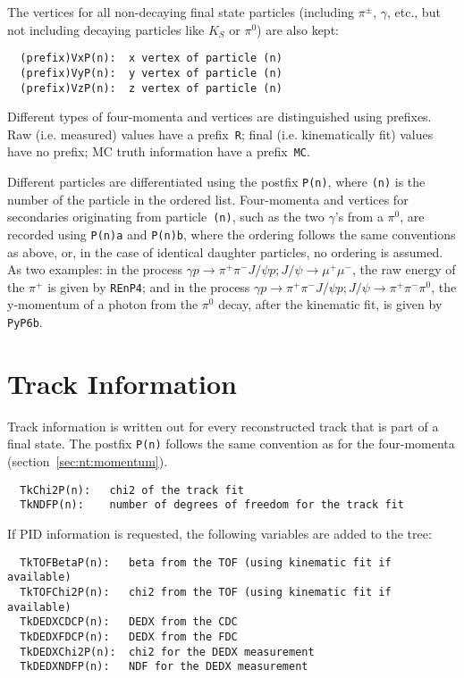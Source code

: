 \documentclass[11pt]{article}
\begin{document}
The vertices for all non-decaying final state particles (including $\pi^\pm$, $\gamma$, etc., but not including decaying particles like $K_S$ or $\pi^0$) are also kept:

\begin{verbatim}
  (prefix)VxP(n):  x vertex of particle (n)
  (prefix)VyP(n):  y vertex of particle (n)
  (prefix)VzP(n):  z vertex of particle (n)
\end{verbatim}

Different types of four-momenta and vertices are distinguished using prefixes.  Raw (i.e. measured) values have a prefix~{\tt R}; final (i.e. kinematically fit) values have no prefix; MC truth information have a prefix~{\tt MC}.

Different particles are differentiated using the postfix {\tt P(n)}, where {\tt (n)} is the number of the particle in the ordered list.  Four-momenta and vertices for secondaries originating from particle~{\tt (n)}, such as the two $\gamma$'s from a $\pi^0$, are recorded using {\tt P(n)a} and {\tt P(n)b}, where the ordering follows the same conventions as above, or, in the case of identical daughter particles, no ordering is assumed.  As two examples: in the process $\gamma p \to\pi^+\pi^-J/\psi p; J/\psi\to\mu^+\mu^-$, the raw energy of the $\pi^+$ is given by {\tt REnP4}; and in the process $\gamma p \to \pi^+\pi^-J/\psi p; J/\psi\to\pi^+\pi^-\pi^0$, the y-momentum of a photon from the $\pi^0$ decay, after the kinematic fit, is given by {\tt PyP6b}.




\section{Track Information}
\label{sec:nt:track}

Track information is written out for every reconstructed track that is part of a final state.  The postfix {\tt P(n)} follows the same convention as for the four-momenta (section~\ref{sec:nt:momentum}).
\begin{verbatim}
  TkChi2P(n):   chi2 of the track fit
  TkNDFP(n):    number of degrees of freedom for the track fit
\end{verbatim}

If PID information is requested, the following variables are added to the tree:
\begin{verbatim}
  TkTOFBetaP(n):   beta from the TOF (using kinematic fit if available)
  TkTOFChi2P(n):   chi2 from the TOF (using kinematic fit if available)
  TkDEDXCDCP(n):   DEDX from the CDC
  TkDEDXFDCP(n):   DEDX from the FDC
  TkDEDXChi2P(n):  chi2 for the DEDX measurement
  TkDEDXNDFP(n):   NDF for the DEDX measurement
\end{verbatim}
\end{document}

